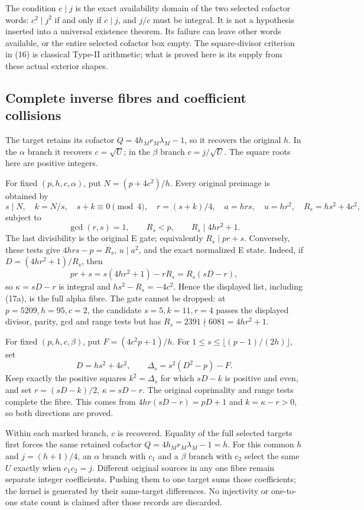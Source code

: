 The condition $c\mid j$ is the exact availability domain of the two selected
cofactor words: $c^2\mid j^2$ if and only if $c\mid j$, and $j/c$ must be integral.
It is not a hypothesis inserted into a universal existence theorem. Its failure
can leave other words available, or the entire selected cofactor box empty.
The square-divisor criterion in (16) is classical Type-II arithmetic; what is
proved here is its supply from these actual exterior shapes.

\subsection{Complete inverse fibres and coefficient collisions}
The target retains its cofactor $Q=4h_Mr_M\lambda_M-1$, so it recovers the
original $h$. In the $\alpha$ branch it recovers $c=\sqrt U$; in the $\beta$
branch $c=j/\sqrt U$. The square roots here are positive integers.

For fixed $(p,h,c,\alpha)$, put $N=(p+4c^2)/h$. Every original preimage is
obtained by
\[
 s\mid N,\quad k=N/s,\quad s+k\equiv0\pmod4,\quad r=(s+k)/4,
 \quad a=hrs,\quad u=hr^2,\quad R_s=hs^2+4c^2,
\]
subject to
\[
 \gcd(r,s)=1,\qquad R_s<p,\qquad R_s\mid4hr^2+1.       \tag{17a}
\]
The last divisibility is the original E gate; equivalently
$R_s\mid pr+s$.  Conversely, these tests give
$4hrs-p=R_s$, $u\mid a^2$, and the exact normalized E state.  Indeed, if
$D=(4hr^2+1)/R_s$, then
\[
 pr+s=s(4hr^2+1)-rR_s=R_s(sD-r),
\]
so $\kappa=sD-r$ is integral and
$hs^2-R_s=-4c^2$.  Hence the displayed list, including (17a), is the full
alpha fibre.  The gate cannot be dropped: at
$p=5209,h=95,c=2$, the candidate $s=5,k=11,r=4$ passes the displayed
divisor, parity, gcd and range tests but has
$R_s=2391\nmid6081=4hr^2+1$.

For fixed $(p,h,c,\beta)$, put $F=(4c^2p+1)/h$. For
$1\le s\le\lfloor(p-1)/(2h)\rfloor$, set
\[
 D=hs^2+4c^2,\qquad \Delta_s=s^2(D^2-p)-F.
\]
Keep exactly the positive squares $k^2=\Delta_s$ for which
$sD-k$ is positive and even, and set $r=(sD-k)/2$, $\kappa=sD-r$.
The original coprimality and range tests complete the fibre. This comes from
$4hr(sD-r)=pD+1$ and $k=\kappa-r>0$, so both directions are proved.

Within each marked branch, $c$ is recovered. Equality of the full selected
targets first forces the same retained cofactor
$Q=4h_Mr_M\lambda_M-1=h$.  For this common $h$ and
$j=(h+1)/4$, an $\alpha$ branch with $c_1$ and a $\beta$ branch with $c_2$
select the same $U$ exactly when $c_1c_2=j$. Different original sources in any one fibre remain
separate integer coefficients. Pushing them to one target sums those coefficients;
the kernel is generated by their same-target differences. No injectivity or
one-to-one state count is claimed after those records are discarded.

